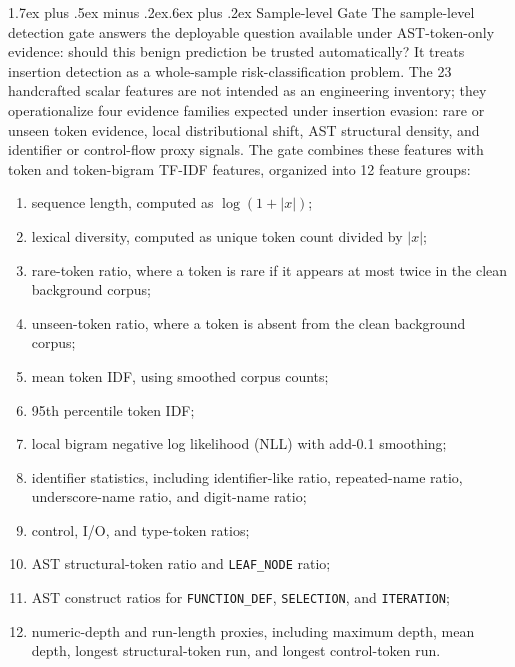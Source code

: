 \documentclass[letterpaper,twocolumn,10pt,twoside]{article}
\makeatletter
\renewcommand\subsection{\@startsection{subsection}{2}{\z@}%
  {1.7ex plus .5ex minus .2ex}{.6ex plus .2ex}%
  {\normalfont\normalsize\bfseries}}
\makeatother
\begin{document}
\subsection{Sample-level Gate}
The sample-level detection gate answers the deployable question available under AST-token-only evidence: should this benign prediction be trusted automatically? It treats insertion detection as a whole-sample risk-classification problem. The 23 handcrafted scalar features are not intended as an engineering inventory; they operationalize four evidence families expected under insertion evasion: rare or unseen token evidence, local distributional shift, AST structural density, and identifier or control-flow proxy signals. The gate combines these features with token and token-bigram TF-IDF features, organized into 12 feature groups:
\begin{enumerate}
  \item sequence length, computed as $\log(1 + |x|)$;
  \item lexical diversity, computed as unique token count divided by $|x|$;
  \item rare-token ratio, where a token is rare if it appears at most twice in the clean background corpus;
  \item unseen-token ratio, where a token is absent from the clean background corpus;
  \item mean token IDF, using smoothed corpus counts;
  \item 95th percentile token IDF;
  \item local bigram negative log likelihood (NLL) with add-0.1 smoothing;
  \item identifier statistics, including identifier-like ratio, repeated-name ratio, underscore-name ratio, and digit-name ratio;
  \item control, I/O, and type-token ratios;
  \item AST structural-token ratio and \texttt{LEAF\_NODE} ratio;
  \item AST construct ratios for \texttt{FUNCTION\_DEF}, \texttt{SELECTION}, and \texttt{ITERATION};
  \item numeric-depth and run-length proxies, including maximum depth, mean depth, longest structural-token run, and longest control-token run.
\end{enumerate}
\end{document}
